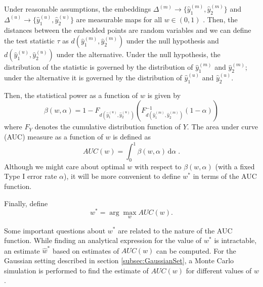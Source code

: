 \documentclass[12pt,oneside,final]{thesis}\usepackage[]{graphicx}\usepackage[]{color}
\begin{document}
 Under reasonable assumptions, the embeddings $\Delta^{(m)} \rightarrow  \{\hat{y}_{1}^{(m)},\hat{y}_{2}^{(m)}\!\}$  and $\Delta^{(u)}\rightarrow \{\hat{y}_{1}^{(u)} , \hat{y}_{2}^{(u)}\}$ are measurable maps for all $w \in (0,1)$ \cite{measurable_Niemiro1992}. Then, the distances between the embedded points are random variables and we can define the test statistic $\tau$ as $d(\hat{y}_{1}^{(m)},\hat{y}_{2}^{(m)})$ under the null hypothesis  and $d(\hat{y}_{1}^{(u)},\hat{y}_{2}^{(u)})$ under the alternative. Under the null hypothesis, the distribution of the statistic is governed by the distribution of $\hat{y}_{1}^{(m)}$ and $\hat{y}_{2}^{(m)}$; under the alternative it is governed by  the distribution of $\hat{y}_{1}^{(u)}$ and $\hat{y}_{2}^{(u)}$.

 Then, the statistical power as a function of $w$ is given by  \[\beta\left( w,\alpha\right)=1-F_{d \left(\hat{y}_{1}^{(u)},\hat{y}_{2}^{(u)}\right)} \left(F_{d\left(\hat{y}_{1}^{(m)},\hat{y}_{2}^{(m)}\right)}^{-1}(1-\alpha) \right)\] where $F_Y$ denotes  the   cumulative distribution function of  $Y$. The area under curve (AUC) measure  as a function of $w$ is defined as  
\begin{equation} 
AUC(w)=\int_{0}^{1}\! \beta\left( w,\alpha\right)\,\mathrm{d}\alpha \; . \label{AUC_def}
\end{equation} 
Although we might care about optimal $w$ with respect to  $\beta\left( w,\alpha\right)$ (with a fixed Type I error rate $\alpha$),  it will be more convenient to define $w^*$ in terms of the AUC function.

 Finally, define $$w^{*}=\arg\max_w{AUC\left( w\right)}. $$

 Some important questions about $w^*$ are  related to the nature of the AUC function.
While finding an analytical expression for the value of $w^*$ is intractable, an estimate $\hat{w}^*$  based on  estimates of $AUC(w)$ %
 can be computed.  For the Gaussian setting described in  section \ref{subsec:GaussianSet}, a Monte Carlo simulation is performed  to find the estimate of $AUC(w)$ for different values of $w$.
\end{document}
